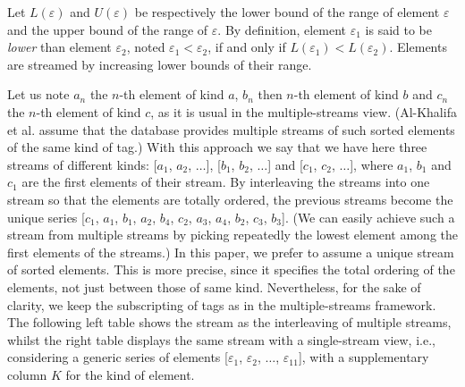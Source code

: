Let \(L(\varepsilon)\) and \(U(\varepsilon)\) be respectively the
 lower bound of the range of element \(\varepsilon\) and the upper
 bound of the range of \(\varepsilon\). By definition, element
 \(\varepsilon_1\) is said to be \emph{lower} than element
 \(\varepsilon_2\), noted \(\varepsilon_1 < \varepsilon_2\), if and
 only if \(L(\varepsilon_1) < L(\varepsilon_2)\). Elements are
 streamed by increasing lower bounds of their range.

Let us note \(a_n\) the \(n\)-th element of kind \(a\), \(b_n\) then
 \(n\)-th element of kind \(b\) and \(c_n\) the \(n\)-th element of
 kind \(c\), as it is usual in the multiple\hyp{}streams
 view. (Al\hyp{}Khalifa et al. \cite{AlKhalifa:2002} assume that the
 database provides multiple streams of such sorted elements of the
 same kind of tag.) With this approach we say that we have here three
 streams of different kinds: [\(a_1\), \(a_2\), \(\dots\)], [\(b_1\),
 \(b_2\), \(\dots\)] and [\(c_1\), \(c_2\), \(\dots\)], where \(a_1\),
 \(b_1\) and \(c_1\) are the first elements of their stream. By
 interleaving the streams into one stream so that the elements are
 totally ordered, the previous streams become the unique series
 [\(c_1\), \(a_1\), \(b_1\), \(a_2\), \(b_4\), \(c_2\), \(a_3\),
 \(a_4\), \(b_2\), \(c_3\), \(b_3\)]. (We can easily achieve such a
 stream from multiple streams by picking repeatedly the lowest element
 among the first elements of the streams.) In this paper, we prefer to
 assume a unique stream of sorted elements. This is more precise,
 since it specifies the total ordering of the elements, not just
 between those of same kind. Nevertheless, for the sake of clarity, we
 keep the subscripting of tags as in the multiple\hyp{}streams
 framework. The following left table shows the stream as the
 interleaving of multiple streams, whilst the right table displays the
 same stream with a single\hyp{}stream view, i.e., considering a
 generic series of elements [\(\varepsilon_1\), \(\varepsilon_2\),
 \(\dots\), \(\varepsilon_{11}\)], with a supplementary column \(K\)
 for the kind of element.
